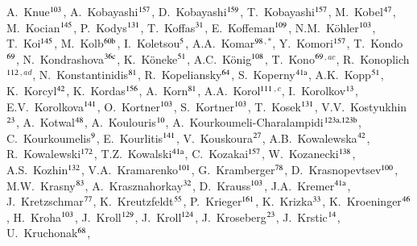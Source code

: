 \begin{flushleft}
A.~Knue$^\textrm{\scriptsize 103}$,
A.~Kobayashi$^\textrm{\scriptsize 157}$,
D.~Kobayashi$^\textrm{\scriptsize 159}$,
T.~Kobayashi$^\textrm{\scriptsize 157}$,
M.~Kobel$^\textrm{\scriptsize 47}$,
M.~Kocian$^\textrm{\scriptsize 145}$,
P.~Kodys$^\textrm{\scriptsize 131}$,
T.~Koffas$^\textrm{\scriptsize 31}$,
E.~Koffeman$^\textrm{\scriptsize 109}$,
N.M.~K\"ohler$^\textrm{\scriptsize 103}$,
T.~Koi$^\textrm{\scriptsize 145}$,
M.~Kolb$^\textrm{\scriptsize 60b}$,
I.~Koletsou$^\textrm{\scriptsize 5}$,
A.A.~Komar$^\textrm{\scriptsize 98}$$^{,*}$,
Y.~Komori$^\textrm{\scriptsize 157}$,
T.~Kondo$^\textrm{\scriptsize 69}$,
N.~Kondrashova$^\textrm{\scriptsize 36c}$,
K.~K\"oneke$^\textrm{\scriptsize 51}$,
A.C.~K\"onig$^\textrm{\scriptsize 108}$,
T.~Kono$^\textrm{\scriptsize 69}$$^{,ac}$,
R.~Konoplich$^\textrm{\scriptsize 112}$$^{,ad}$,
N.~Konstantinidis$^\textrm{\scriptsize 81}$,
R.~Kopeliansky$^\textrm{\scriptsize 64}$,
S.~Koperny$^\textrm{\scriptsize 41a}$,
A.K.~Kopp$^\textrm{\scriptsize 51}$,
K.~Korcyl$^\textrm{\scriptsize 42}$,
K.~Kordas$^\textrm{\scriptsize 156}$,
A.~Korn$^\textrm{\scriptsize 81}$,
A.A.~Korol$^\textrm{\scriptsize 111}$$^{,c}$,
I.~Korolkov$^\textrm{\scriptsize 13}$,
E.V.~Korolkova$^\textrm{\scriptsize 141}$,
O.~Kortner$^\textrm{\scriptsize 103}$,
S.~Kortner$^\textrm{\scriptsize 103}$,
T.~Kosek$^\textrm{\scriptsize 131}$,
V.V.~Kostyukhin$^\textrm{\scriptsize 23}$,
A.~Kotwal$^\textrm{\scriptsize 48}$,
A.~Koulouris$^\textrm{\scriptsize 10}$,
A.~Kourkoumeli-Charalampidi$^\textrm{\scriptsize 123a,123b}$,
C.~Kourkoumelis$^\textrm{\scriptsize 9}$,
E.~Kourlitis$^\textrm{\scriptsize 141}$,
V.~Kouskoura$^\textrm{\scriptsize 27}$,
A.B.~Kowalewska$^\textrm{\scriptsize 42}$,
R.~Kowalewski$^\textrm{\scriptsize 172}$,
T.Z.~Kowalski$^\textrm{\scriptsize 41a}$,
C.~Kozakai$^\textrm{\scriptsize 157}$,
W.~Kozanecki$^\textrm{\scriptsize 138}$,
A.S.~Kozhin$^\textrm{\scriptsize 132}$,
V.A.~Kramarenko$^\textrm{\scriptsize 101}$,
G.~Kramberger$^\textrm{\scriptsize 78}$,
D.~Krasnopevtsev$^\textrm{\scriptsize 100}$,
M.W.~Krasny$^\textrm{\scriptsize 83}$,
A.~Krasznahorkay$^\textrm{\scriptsize 32}$,
D.~Krauss$^\textrm{\scriptsize 103}$,
J.A.~Kremer$^\textrm{\scriptsize 41a}$,
J.~Kretzschmar$^\textrm{\scriptsize 77}$,
K.~Kreutzfeldt$^\textrm{\scriptsize 55}$,
P.~Krieger$^\textrm{\scriptsize 161}$,
K.~Krizka$^\textrm{\scriptsize 33}$,
K.~Kroeninger$^\textrm{\scriptsize 46}$,
H.~Kroha$^\textrm{\scriptsize 103}$,
J.~Kroll$^\textrm{\scriptsize 129}$,
J.~Kroll$^\textrm{\scriptsize 124}$,
J.~Kroseberg$^\textrm{\scriptsize 23}$,
J.~Krstic$^\textrm{\scriptsize 14}$,
U.~Kruchonak$^\textrm{\scriptsize 68}$,

\end{flushleft}
